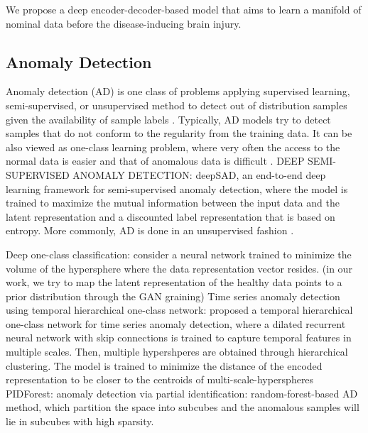\documentclass{article}
\begin{document}
	We propose a deep encoder-decoder-based model that aims to learn a manifold of nominal data before the disease-inducing brain injury.
	
	\subsection{Anomaly Detection}
	Anomaly detection (AD) is one class of problems applying supervised learning, semi-supervised\cite{ruff2019deep}, or unsupervised method to detect out of distribution samples given the availability of sample labels \cite{NEURIPS2019_805163a0}. Typically, AD models try to detect samples that do not conform to the regularity from the training data. It can be also viewed as one-class learning problem, where very often the access to the normal data is easier and that of anomalous data is difficult \cite{shen2020timeseries,ruff2019self,ruff2018deep,shen2020timeseries}. 
	\cite{ruff2019deep} DEEP SEMI-SUPERVISED ANOMALY DETECTION: deepSAD, an end-to-end deep learning framework for semi-supervised anomaly detection, where the model is trained to maximize the mutual information between the input data and the latent representation and a discounted label representation that is based on entropy. 
	More commonly, AD is done in an unsupervised fashion \cite{references}.
	
	\cite{ruff2018deep}%
	Deep one-class classification: consider a neural network trained to minimize the volume of the hypersphere where the data representation vector resides. (in our work, we try to map the latent representation of the healthy data points to a prior distribution through the GAN graining)
	\cite{shen2020timeseries} Time series anomaly detection using temporal hierarchical one-class network: proposed a temporal hierarchical one-class network for time series anomaly detection, where a dilated recurrent neural network with skip connections is trained to capture temporal features in multiple scales. Then, multiple hypershperes are obtained through hierarchical clustering. The model is trained to minimize the distance of the encoded representation to be closer to the centroids of multi-scale-hyperspheres
	\cite{gopalan2019pidforest} PIDForest: anomaly detection via partial identification: random-forest-based AD method, which partition the space into subcubes and the anomalous samples will lie in subcubes with high sparsity.
	
\end{document}
